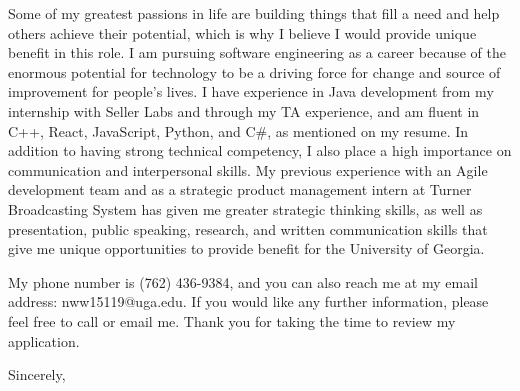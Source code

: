 \documentclass{letter} %
\begin{document}
\begin{letter}
\noindent Some of my greatest passions in life are building things that fill a need and help others achieve their potential, which is why I believe I would provide unique benefit in this role. I am pursuing software engineering as a career because of the enormous potential for technology to be a driving force for change and source of improvement for people's lives. I have experience in Java development from my internship with Seller Labs and through my TA experience, and am fluent in C++, React, JavaScript, Python, and C$\#$, as mentioned on my resume. In addition to having strong technical competency, I also place a high importance on communication and interpersonal skills. My previous experience with an Agile development team and as a strategic product management intern at Turner Broadcasting System has given me greater strategic thinking skills, as well as presentation, public speaking, research, and written communication skills that give me unique opportunities to provide benefit for the University of Georgia.
 
\noindent 
My phone number is (762) 436-9384, and you can also reach me at my email address: nww15119@uga.edu. If you would like any further information, please feel free to call or email me. Thank you for taking the time to review my application.
 
\closing{Sincerely,} 
 

 

\end{letter}
 
\end{document}
